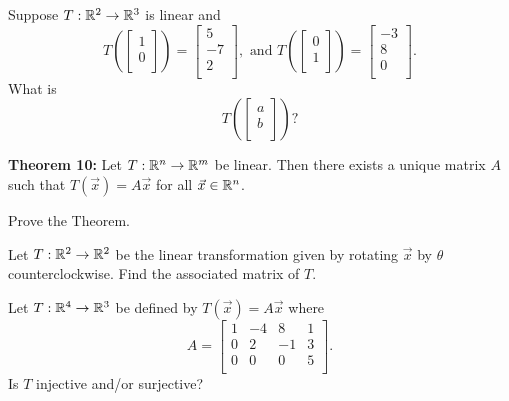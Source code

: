 \documentclass[12pt,letterpaper]{article}
\begin{document}
\begin{enumerate}

\Problem Suppose $T: \mathbb{R}^2 \to \mathbb{R}^3$ is linear and $$T\left( \begin{bmatrix} 1\\ 0\\ \end{bmatrix} \right)=\begin{bmatrix} 5\\ -7\\ 2\\ \end{bmatrix}, \text{ and } T\left( \begin{bmatrix} 0\\ 1\\ \end{bmatrix} \right)=\begin{bmatrix} -3\\ 8\\ 0\\ \end{bmatrix}.$$ What is $$T\left( \begin{bmatrix} a\\ b\\ \end{bmatrix} \right)?$$

\vfill


{\bf Theorem 10:} Let $T: \mathbb{R}^n \to \mathbb{R}^m$ be linear. Then there exists a unique matrix $A$ such that $T(\vec{x})=A\vec{x}$ for all $\vec{x} \in \mathbb{R}^n$.

\Problem Prove the Theorem.

\vfill

\vfill 

\newpage

\Problem Let $T: \mathbb{R}^2 \to \mathbb{R}^2$ be the linear transformation given by rotating $\vec{x}$ by $\theta$ counterclockwise. Find the associated matrix of $T$.

\vfill

\Problem Let $T: \mathbb{R}^4 \to \mathbb{R}^3$ be defined by $T(\vec{x})=A\vec{x}$ where $$A=\begin{bmatrix}
1 & -4 & 8 &1\\
0 & 2 & -1 &3\\
0 & 0 &0 & 5\\
\end{bmatrix}.$$ Is $T$ injective and/or surjective?

\vfill


\end{enumerate}
\end{document}
